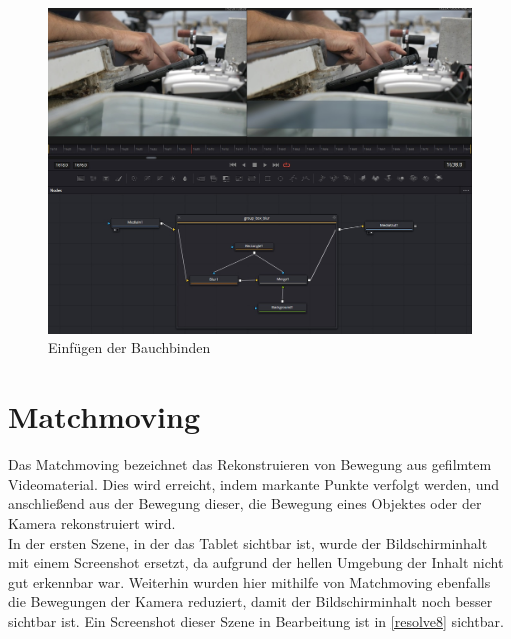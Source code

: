 \begin{figure}[H]
\begin{center}
\includegraphics[width=\textwidth]{gfx/post/resolve3.jpg}
\caption{Einfügen der Bauchbinden}
\label{resolve3}
\end{center}
\end{figure}
%
\section{Matchmoving}



Das Matchmoving bezeichnet das Rekonstruieren von Bewegung aus gefilmtem Videomaterial. Dies wird erreicht, indem markante Punkte verfolgt werden, und anschließend aus der Bewegung dieser, die Bewegung eines Objektes oder der Kamera rekonstruiert wird. \\
In der ersten Szene, in der das Tablet sichtbar ist, wurde der Bildschirminhalt mit einem Screenshot ersetzt, da aufgrund der hellen Umgebung der Inhalt nicht gut erkennbar war. Weiterhin wurden hier mithilfe von Matchmoving ebenfalls die Bewegungen der Kamera reduziert, damit der Bildschirminhalt noch besser sichtbar ist. Ein Screenshot dieser Szene in Bearbeitung ist in \autoref{resolve8} sichtbar.\\

